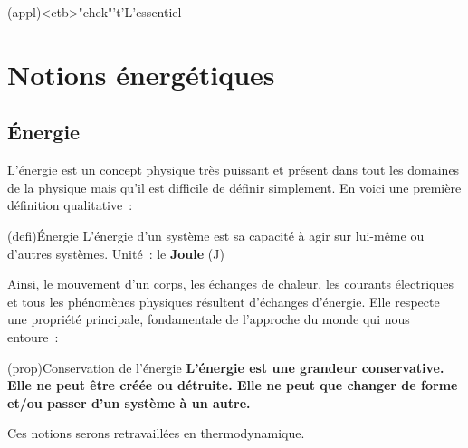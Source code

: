 \documentclass[../../main/main.tex]{subfiles}
\begin{document}
\vspace*{\fill}
\newpage
\vspace*{\fill}

\begin{tcn}[%
		sidebyside, fontupper=\small, fontlower=\small
	](appl)<ctb>"chek"'t'{L'essentiel}
	\tcblower
\end{tcn}

\vspace*{\fill}

\newpage

\section{Notions énergétiques}
\subsection{Énergie}
L'énergie est un concept physique très puissant et présent dans tout les
domaines de la physique mais qu'il est difficile de définir simplement. En voici
une première définition qualitative~:
\begin{tcb*}[sidebyside, righthand ratio=.3](defi){Énergie}
	L'énergie d'un système est sa capacité à agir sur lui-même ou d'autres
	systèmes.
	\tcblower
	Unité~: le \textbf{Joule} (J)
\end{tcb*}

Ainsi, le mouvement d'un corps, les échanges de chaleur, les courants
électriques et tous les phénomènes physiques résultent d'échanges d'énergie.
Elle respecte une propriété principale, fondamentale de l'approche du monde qui
nous entoure~:

\begin{tcb*}(prop){Conservation de l'énergie}
	\bfseries
	L'énergie est une grandeur conservative. Elle ne peut être créée ou
	détruite. Elle ne peut que changer de forme et/ou passer d'un système à un
	autre.
\end{tcb*}

Ces notions serons retravaillées en thermodynamique.

\vspace{-10pt}
\end{document}
